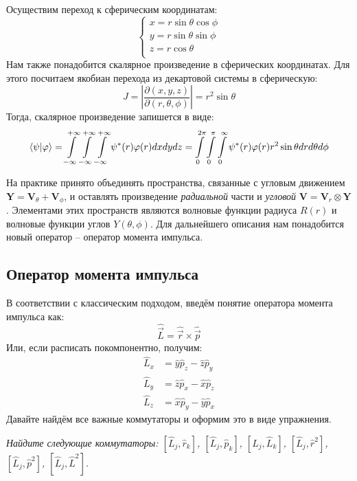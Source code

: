 Осуществим переход к сферическим координатам:
\[
\begin{cases}
x = r \sin \theta \cos \phi\\
y = r \sin \theta \sin \phi \\
z = r \cos \theta \\
\end{cases}
\]
Нам также понадобится скалярное произведение в сферических координатах. Для этого посчитаем якобиан перехода из декартовой системы в сферическую:
\[
J = \left|\frac{\partial(x, y, z)}{\partial(r, \theta, \phi)}\right| = r^2\sin\theta
\]
Тогда, скалярное произведение запишется в виде:
\[
\bra{\psi}\ket{\varphi} = \int\limits_{-\infty}^{+\infty}\int\limits_{-\infty}^{+\infty}\int\limits_{-\infty}^{+\infty}\psi^*(r)\varphi(r)dxdydz= \int\limits_0^{2\pi}\int\limits_0^{\pi}\int\limits_0^{\infty}\psi^*(r)\varphi(r)r^2\sin\theta dr d\theta d\phi
\]

На практике принято объединять пространства, связанные с угловым движением $\mathbf{Y} = \mathbf{V}_{\theta} + \mathbf{V}_{\phi}$, и оставлять произведение \textit{радиальной} части и \textit{угловой} $\mathbf{V} = \mathbf{V}_r \otimes \mathbf{Y}$. Элементами этих пространств являются волновые функции радиуса $R(r)$ и волновые функции углов $Y(\theta, \phi)$. Для дальнейшего описания нам понадобится новый оператор -- оператор момента импульса.
\subsection{Оператор момента импульса}
\hspace{1em} В соответствии с классическим подходом, введём понятие оператора момента импульса как:
\[
\hat{\Vec{L}} = \hat{\Vec{r}} \times \hat{\Vec{p}}
\]
Или, если расписать покомпонентно, получим:
\begin{align*}
    \hat{L}_x &= \hat{y}\hat{p}_z - \hat{z}\hat{p}_y\\
    \hat{L}_y &= \hat{z}\hat{p}_x - \hat{x}\hat{p}_z\\
    \hat{L}_z &= \hat{x}\hat{p}_y - \hat{y}\hat{p}_x
\end{align*}
Давайте найдём все важные коммутаторы и оформим это в виде упражнения.
\begin{center}
    \textit{Найдите следующие коммутаторы: $[\hat{L}_j, \hat{r}_k]$, $[\hat{L}_j, \hat{p}_k]$, $[\hat{L}_j, \hat{L}_k]$, $[\hat{L}_j, \hat{r}^2]$, $[\hat{L}_j, \hat{p}^2]$, $[\hat{L}_j, \hat{L}^2]$.}
\end{center}

